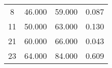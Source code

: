 % 
\begin{tabular}{cccc}
  \hline
  \hline
8 & 46.000 & 59.000 & 0.087 \\ 
  11 & 50.000 & 63.000 & 0.130 \\ 
  21 & 60.000 & 66.000 & 0.043 \\ 
  23 & 64.000 & 84.000 & 0.609 \\ 
   \hline
\end{tabular}
